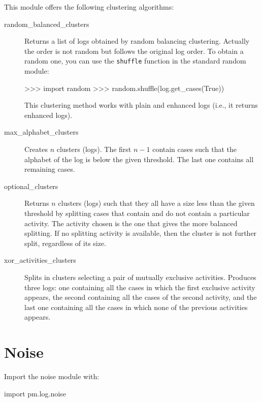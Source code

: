 \documentclass[a4paper,10pt]{book}
\begin{document}
This module offers the following clustering algorithms:
\begin{description}
 \item [random\_balanced\_clusters] Returns a list of logs obtained by random
    balancing clustering. Actually the order is not random but follows the original log order. To obtain a random one, you can use the \texttt{shuffle} function in the standard random module:\\
\begin{pycode}
>>> import random
>>> random.shuffle(log.get_cases(True))
\end{pycode}
% 
This clustering method works with plain and enhanced logs (i.e., it returns enhanced logs).
 \item [max\_alphabet\_clusters] Creates $n$ clusters (logs). The first $n-1$ contain cases such that the
    alphabet of the log is below the given threshold. The last one contains all 
    remaining cases.
 \item [optional\_clusters] Returns $n$ clusters (logs) such that they all have a size less than the given threshold by 
    splitting cases that contain and do not contain a particular activity. The
    activity chosen is the one that gives the more balanced splitting. If no
    splitting activity is available, then the cluster is not further split, 
    regardless of its size.
 \item [xor\_activities\_clusters] Splits in clusters selecting a pair of mutually exclusive activities.
    Produces three logs: one containing all the cases in which the first 
    exclusive activity appears, the second containing all the cases of the 
    second activity, and the last one containing all the cases in which none of
    the previous activities appears.
\end{description}

\section{Noise}
Import the noise module with:\\
\begin{pycode}
import pm.log.noise
\end{pycode}
\end{document}
